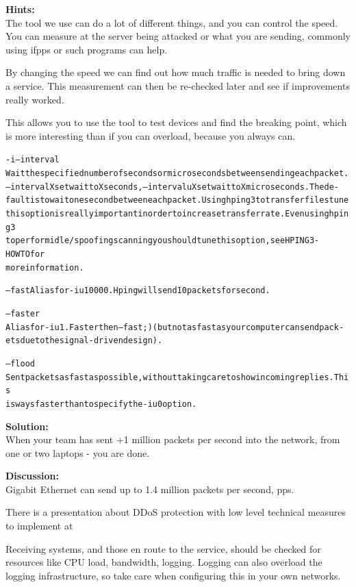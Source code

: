 \documentclass[a4paper,11pt,notitlepage]{report}
\begin{document}
{\bf Hints:}\\
The tool we use can do a lot of different things, and you can control the speed. You can measure at the server being attacked or what you are sending, commonly using ifpps or such programs can help.

By changing the speed we can find out how much traffic is needed to bring down a service. This measurement can then be re-checked later and see if improvements really worked.

This allows you to use the tool to test devices and find the breaking point, which is more interesting than if you can overload, because you always can.
\begin{alltt}\footnotesize
-i --interval
       Wait  the  specified  number  of  seconds or micro seconds between sending each packet.
       --interval X set wait to X seconds, --interval uX set wait to X micro seconds.  The de-
       fault  is  to  wait one second between each packet. Using hping3 to transfer files tune
       this option is really important in order to increase transfer rate. Even  using  hping3
       to  perform  idle/spoofing  scanning  you should tune this option, see HPING3-HOWTO for
       more information.

--fast Alias for -i u10000. Hping will send 10 packets for second.

--faster
       Alias for -i u1. Faster then --fast ;) (but not as fast as your computer can send pack-
       ets due to the signal-driven design).

--flood
       Sent  packets  as fast as possible, without taking care to show incoming replies.  This
       is ways faster than to specify the -i u0 option.
\end{alltt}

{\bf Solution:}\\
When your team has sent +1 million packets per second into the network, from one or two laptops - you are done.

{\bf Discussion:}\\
Gigabit Ethernet can send up to 1.4 million packets per second, pps.

There is a presentation about DDoS protection with low level technical measures to implement at\\
{\footnotesize {}}

Receiving systems, and those en route to the service, should be checked for resources like CPU load, bandwidth, logging. Logging can also overload the logging infrastructure, so take care when configuring this in your own networks.
\end{document}
